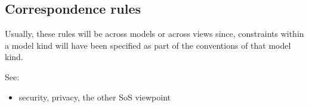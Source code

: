 %
%
%
%
%
%



\subsection{Correspondence rules}\label{CRs}


Usually, these rules will be across models or across views since,
constraints within a model kind will have been specified as part of
the conventions of that model kind.

See: 

\begin{itemize}
\item security, privacy, the other SoS viewpoint
\end{itemize}

